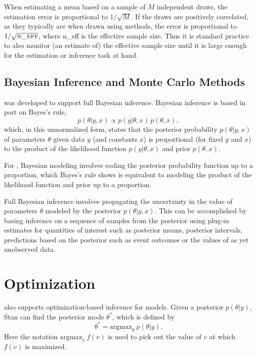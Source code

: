 When estimating a mean based on a sample of $M$ independent draws, the
estimation error is proportional to $1/\sqrt{M}$.  If the draws are
positively correlated, as they typically are when drawn using \MCMC
methods, the error is proportional to $1/\sqrt{\mbox{\sc n\_eff}}$,
where {\sc n\_eff} is the effective sample size.  Thus it is standard
practice to also monitor (an estimate of) the effective sample size
until it is large enough for the estimation or inference task at
hand.  

\subsection{Bayesian Inference and Monte Carlo Methods}

\Stan was developed to support full Bayesian inference.  Bayesian
inference is based in part on Bayes's rule,
\[
p(\theta|y,x) \propto p(y|\theta,x) \, p(\theta,x),
\]
which, in this unnormalized form, states that the posterior
probability $p(\theta|y,x)$ of parameters $\theta$ given data $y$ (and
constants $x$) is proportional (for fixed $y$ and $x$) to the
product of the likelihood function $p(y|\theta,x)$ and prior
$p(\theta,x)$.

For \Stan, Bayesian modeling involves coding the posterior probability
function up to a proportion, which Bayes's rule shows is equivalent to
modeling the product of the likelihood function and prior up to a
proportion.

Full Bayesian inference involves propagating the uncertainty in the
value of parameters $\theta$ modeled by the posterior $p(\theta|y,x)$.
This can be accomplished by basing inference on a sequence of samples
from the posterior using plug-in estimates for quantities of interest
such as posterior means, posterior intervals, predictions based on the
posterior such as event outcomes or the values of as yet unobserved
data.



\section{Optimization}

\Stan also supports optimization-based inference for models.  Given a
posterior $p(\theta|y)$, Stan can find the posterior mode $\theta^*$,
which is defined by
%
\[
\theta^{*} = \mbox{argmax}_{\theta} \ p(\theta|y).
\]
%
Here the notation $\mbox{argmax}_v \ f(v)$ is used to pick out the value
of $v$ at which $f(v)$ is maximized.

